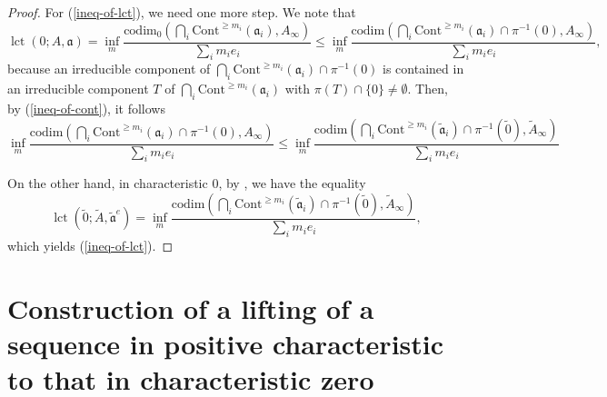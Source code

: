 \documentclass[a4paper]{amsart}
\renewcommand{\a}{{\mathfrak{a}}}
\newcommand{\cont}{{\mathrm{Cont}}}
\newcommand{\codim}{{\mathrm{codim}}}
\newcommand{\lct}{{\operatorname{lct}}}
\newcommand{\taa}{{\widetilde{\mathfrak a}}}
\newcommand{\wa}{{\widetilde{A}}}
\newcommand{\tze}{{\tilde 0}}
\theoremstyle{definition}
\begin{document}
\begin{proof}
For (\ref{ineq-of-lct}), we need one more step.
     We note that 
   $$\lct(0;A,\a)=\inf_m \frac{\codim_0(\bigcap_i\cont^{\geq m_i}(\a_i), A_\infty)}{\sum_im_ie_i}\leq \inf_m\frac{ \codim (\bigcap_i\cont^{\geq m_i}(\a_i)\cap \pi^{-1}(0), A_\infty)}{\sum_im_ie_i},$$
   because an irreducible component of $\bigcap_i\cont^{\geq m_i}(\a_i)\cap \pi^{-1}(0)$ is contained in an
   irreducible component $T$  of 
 $\bigcap_i\cont^{\geq m_i}(\a_i)$  with $\pi(T)\cap\{0\}\neq \emptyset$.
   Then, by (\ref{ineq-of-cont}), it follows
   $$\inf _m\frac{ \codim (\bigcap_i\cont^{\geq m_i}(\a_i)\cap \pi^{-1}(0), A_\infty)}{\sum_im_ie_i}
\leq \inf_m \frac{\codim (\bigcap_i\cont^{\geq m_i}(\taa_i)\cap \pi^{-1}(\tze), \wa_\infty)}{\sum_im_ie_i}$$
  
  On the other hand, in  characteristic $0$, by \cite[Lemma 2.6]{dm}, we have the equality
    $$\lct (\tze; \wa, \taa^e)=\inf _m\frac{\codim (\bigcap_i\cont^{\geq m_i}(\taa_i)\cap \pi^{-1}(\tze), \wa_\infty)}{\sum_im_ie_i},$$
    which yields (\ref{ineq-of-lct}).
   
\end{proof}










\section{Construction of a  lifting of a sequence in positive characteristic to that in characteristic zero }
\end{document}
